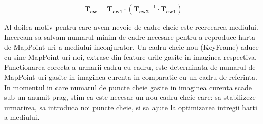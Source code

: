\documentclass[12pt,a4paper]{report}
\begin{document}
\begin{equation}
\mathbf{T_{cw}} = \mathbf{T_{cw1}} \cdot \left( \mathbf{T_{cw2}}^{-1} \cdot \mathbf{T_{cw1}} \right)
\end{equation} 

Al doilea motiv pentru care avem nevoie de cadre cheie este recreearea mediului. Incercam sa salvam
numarul minim de cadre necesare pentru a reproduce harta de MapPoint-uri a mediului inconjurator.
Un cadru cheie nou (KeyFrame) aduce cu sine MapPoint-uri noi, extrase din feature-urile gasite in 
imaginea respectiva. Functionarea corecta a urmarii cadru cu cadru, este determinata de numarul de 
MapPoint-uri gasite in imaginea curenta in comparatie cu un cadru de referinta. In momentul 
in care numarul de puncte cheie gasite in imaginea curenta scade sub un anumit prag, stim ca este
necesar un nou cadru cheie care: sa stabilizeze urmarirea, sa introduca noi puncte cheie, si sa 
ajute la optimizarea intregii harti a mediului. 
\end{document}
